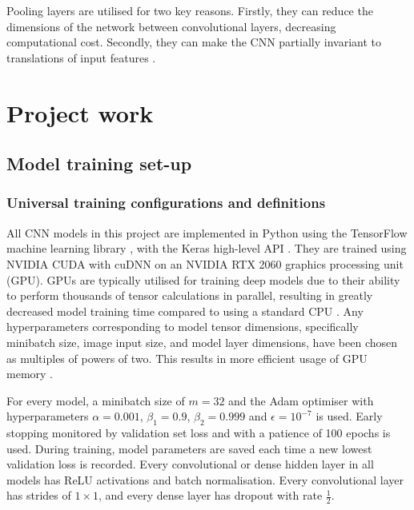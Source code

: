 \documentclass[12pt]{article}
\begin{document}
Pooling layers are utilised for two key reasons. Firstly, they can reduce the dimensions of the network between convolutional layers, decreasing computational cost. Secondly, they can make the CNN partially invariant to translations of input features \cite{Aghdam17, Goodfellow16}.
\section{Project work}
\subsection{Model training set-up}
\subsubsection{Universal training configurations and definitions}
All CNN models in this project are implemented in Python using the TensorFlow machine learning library \cite{Abadi16}, with the Keras high-level API \cite{Gulli17}. They are trained using NVIDIA CUDA with cuDNN \cite{Cook12} on an NVIDIA RTX 2060 graphics processing unit (GPU). GPUs are typically utilised for training deep models due to their ability to perform thousands of tensor calculations in parallel, resulting in greatly decreased model training time compared to using a standard CPU \cite{Shi16, Goodfellow16}. Any hyperparameters corresponding to model tensor dimensions, specifically minibatch size, image input size, and model layer dimensions, have been chosen as multiples of powers of two. This results in more efficient usage of GPU memory \cite{Goodfellow16}. 

For every model, a minibatch size of $m=32$ and the Adam optimiser with hyperparameters $\alpha=0.001$, $\beta_1=0.9$, $\beta_2=0.999$ and $\epsilon=10^{-7}$ is used. Early stopping  monitored by validation set loss and with a patience of 100 epochs is used. During training, model parameters are saved each time a new lowest validation loss is recorded. Every convolutional or dense hidden layer in all models has ReLU activations and batch normalisation. Every convolutional layer has strides of $1 \times 1$, and every dense layer has dropout with rate $\frac{1}{2}$.
\end{document}
